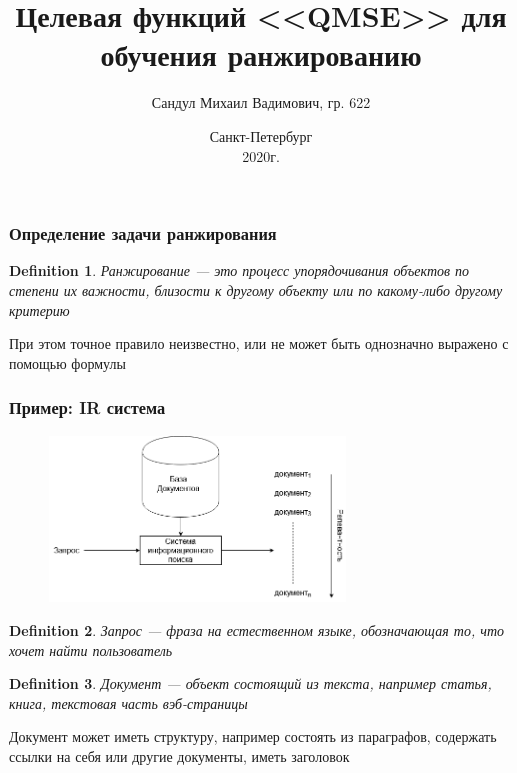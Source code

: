 \documentclass[unicode, notheorems]{beamer}
\title{Целевая функций <<QMSE>> для обучения ранжированию}
\author{Сандул Михаил Вадимович, гр. 622}
\institute{Санкт-Петербургский государственный университет \\
    Математико-Механический факультет \\
    Кафедра статистического моделирования \\
    \vspace{0.4cm}
    Научный руководитель: к.ф.-м.н. Шпилёв П.В. \\
    \vspace{0.3cm}
}
\date{
    Санкт-Петербург\\
    2020г.
}
\newtheorem{definition}{Definition}
\begin{document}
\begin{frame}
    \titlepage
\end{frame}

\begin{frame}

\frametitle{Определение задачи ранжирования}

\begin{definition}
Ранжирование --- это процесс упорядочивания объектов по степени их важности, близости к другому объекту или по какому-либо другому критерию
\end{definition}

При этом точное правило неизвестно, или не может быть однозначно выражено с помощью формулы

\end{frame}

\begin{frame}
\frametitle{Пример: IR система}

\begin{figure}[h]
\centering
\includegraphics[width=0.7\textwidth]{IRSystem.png}
\label{fig:IRSystem}
\end{figure}

\end{frame}

\begin{frame}

\begin{definition}
Запрос --- фраза на естественном языке, обозначающая то, что хочет найти пользователь
\end{definition}

\begin{definition}
Документ --- объект состоящий из текста, например статья, книга, текстовая часть вэб-страницы
\end{definition}

Документ может иметь структуру, например состоять из параграфов, содержать ссылки на себя или другие документы, иметь заголовок 

\end{frame}
\end{document}
